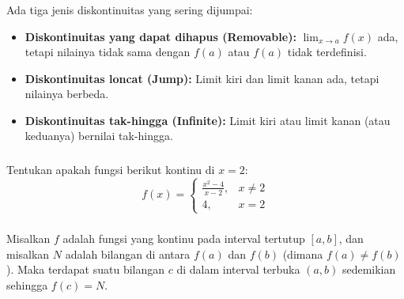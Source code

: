 \documentclass{../../kalkulus-ppt}
\begin{document}
\begin{frame}
    \frametitle{\insertsection}
    Ada tiga jenis diskontinuitas yang sering dijumpai:
    \begin{itemize}
        \item \textbf{Diskontinuitas yang dapat dihapus (Removable):} $\displaystyle\lim_{x\to a} f(x)$ ada, tetapi nilainya tidak sama dengan $f(a)$ atau $f(a)$ tidak terdefinisi.
        \item \textbf{Diskontinuitas loncat (Jump):} Limit kiri dan limit kanan ada, tetapi nilainya berbeda.
        \item \textbf{Diskontinuitas tak-hingga (Infinite):} Limit kiri atau limit kanan (atau keduanya) bernilai tak-hingga.
    \end{itemize}
\end{frame}

\begin{frame}
    \frametitle{\insertsection}
    \begin{contoh}
        Tentukan apakah fungsi berikut kontinu di $x=2$:
        \[f(x) = \begin{cases}
            \frac{x^2-4}{x-2}, & x \ne 2 \\
            4, & x = 2
        \end{cases}\]
    \end{contoh}
\end{frame}

\begin{frame}
    \frametitle{\insertsection}
    \begin{teorema}
        Misalkan $f$ adalah fungsi yang kontinu pada interval tertutup $[a,b]$, dan misalkan $N$ adalah bilangan di antara $f(a)$ dan $f(b)$ (dimana $f(a) \ne f(b)$). Maka terdapat suatu bilangan $c$ di dalam interval terbuka $(a,b)$ sedemikian sehingga $f(c) = N$.
    \end{teorema}
\end{frame}
\end{document}
